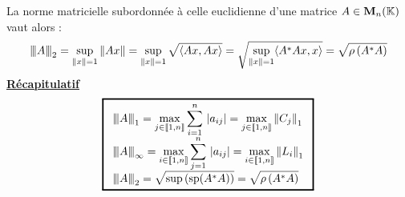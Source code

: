 \documentclass[12pt,a4paper]{article}
\begin{document}
	La norme matricielle subordonnée à celle euclidienne d'une matrice $A\in \mathbf{M}_n(\mathbb{K})$ vaut alors :
	$${\left\vert\kern-0.25ex\left\vert\kern-0.25ex\left\vert A \right\vert\kern-0.25ex\right\vert\kern-0.25ex\right\vert}_2=\sup_{\left\|{x}\right\|=1} \left\|{Ax}\right\|=\sup_{\left\|{x}\right\|=1} \sqrt{\langle Ax, Ax\rangle}=\sqrt{\sup_{\left\|{x}\right\|=1}\langle A^*Ax, x\rangle}=\sqrt{\rho\left(A^*A\right)}$$
	\centering\underline{\textbf{Récapitulatif}}
	\begin{equation*}
		\setlength{\fboxrule}{0.45mm}
		\boxed{\begin{array}{l}
				\grandm\fonctnorm{A}_1=\max_{j\in\llbracket 1,n \rrbracket}\somme{i=1}{n}\abs{a_{ij}}=\max_{j\in\llbracket 1,n \rrbracket} \norm{C_j}_1\\
				\grandm\fonctnorm{A}_{\infty}=\max_{i\in\llbracket 1,n \rrbracket}\somme{j=1}{n}\abs{a_{ij}}=\max_{i\in\llbracket 1,n \rrbracket}\norm{L_i}_1\\
				\grandm\fonctnorm{A}_2=\sqrt{\sup\left(\text{sp}(A^*A)\right)}=\sqrt{\rho\left(A^*A\right)}
		\end{array}}
	\end{equation*}
\end{document}
